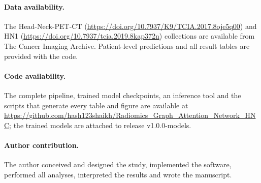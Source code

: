 \documentclass[11pt,a4paper]{article}
\begin{document}
\paragraph{Data availability.}The Head-Neck-PET-CT (\url{https://doi.org/10.7937/K9/TCIA.2017.8oje5q00}) and HN1 (\url{https://doi.org/10.7937/tcia.2019.8kap372n}) collections are available from The Cancer Imaging Archive. Patient-level predictions and all result tables are provided with the code.

\paragraph{Code availability.}The complete pipeline, trained model checkpoints, an inference tool and the scripts that generate every table and figure are available at \url{https://github.com/hash123shaikh/Radiomics_Graph_Attention_Network_HNC}; the trained models are attached to release v1.0.0-models.

\paragraph{Author contribution.}The author conceived and designed the study, implemented the software, performed all analyses, interpreted the results and wrote the manuscript.


{\small
}
\end{document}
